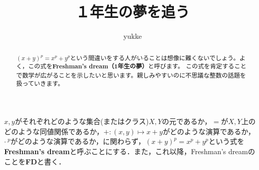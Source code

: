 \documentclass[dvipdfmx]{jlreq}
\title{１年生の夢を追う}
\date{}
\author{yukke}
\newenvironment{dfn}{\begin{mydefinition}}{\end{mydefinition}}
\theoremstyle{myproposition}
\begin{document}
\maketitle

\begin{abstract}
  $(x + y)^p = x^p + y^p$という間違いをする人がいることは想像に難くないでしょう。よく，この式を\textbf{Freshman's dream（1年生の夢）}と呼びます。
  この式を肯定することで数学が広がることを示したいと思います。親しみやすいのに不思議な整数の話題を扱っていきます。
\end{abstract}

\begin{dfn} \label{freshman}
  $x,y$がそれぞれどのような集合(またはクラス)$X,Y$の元であるか，$=$が$X,Y$上のどのような同値関係であるか，$+:(x,y)\mapsto x+y$がどのような演算であるか，$\cdot~^p$がどのような演算であるか，に関わらず，$(x + y)^p = x^p + y^p$という式を\textbf{Freshman's dream}と呼ぶことにする．また，これ以降，Freshman's dreamのことを\textbf{\textsf{FD}}と書く．
\end{dfn}

\tableofcontents












\end{document}
